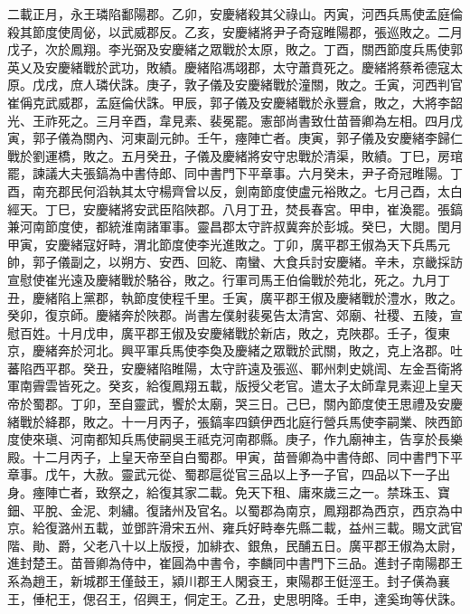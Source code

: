 \begin{pinyinscope}
 二載正月，永王璘陷鄱陽郡。乙卯，安慶緒殺其父祿山。丙寅，河西兵馬使孟庭倫殺其節度使周佖，以武威郡反。乙亥，安慶緒將尹子奇寇睢陽郡，張巡敗之。二月戊子，次於鳳翔。李光弼及安慶緒之眾戰於太原，敗之。丁酉，關西節度兵馬使郭英乂及安慶緒戰於武功，敗績。慶緒陷馮翊郡，太守蕭賁死之。慶緒將蔡希德寇太原。戊戌，庶人璘伏誅。庚子，敦子儀及安慶緒戰於潼關，敗之。壬寅，河西判官崔偁克武威郡，孟庭倫伏誅。甲辰，郭子儀及安慶緒戰於永豐倉，敗之，大將李韶光、王祚死之。三月辛酉，韋見素、裴冕罷。憲部尚書致仕苗晉卿為左相。四月戊寅，郭子儀為關內、河東副元帥。壬午，瘞陣亡者。庚寅，郭子儀及安慶緒李歸仁戰於劉運橋，敗之。五月癸丑，子儀及慶緒將安守忠戰於清渠，敗績。丁巳，房琯罷，諫議大夫張鎬為中書侍郎、同中書門下平章事。六月癸未，尹子奇冠睢陽。丁酉，南充郡民何滔執其太守楊齊曾以反，劍南節度使盧元裕敗之。七月己酉，太白經天。丁巳，安慶緒將安武臣陷陜郡。八月丁丑，焚長春宮。甲申，崔渙罷。張鎬兼河南節度使，都統淮南諸軍事。靈昌郡太守許叔冀奔於彭城。癸巳，大閱。閏月甲寅，安慶緒寇好畤，渭北節度使李光進敗之。丁卯，廣平郡王俶為天下兵馬元帥，郭子儀副之，以朔方、安西、回紇、南蠻、大食兵討安慶緒。辛未，京畿採訪宣慰使崔光遠及慶緒戰於駱谷，敗之。行軍司馬王伯倫戰於苑北，死之。九月丁丑，慶緒陷上黨郡，執節度使程千里。壬寅，廣平郡王俶及慶緒戰於澧水，敗之。癸卯，復京師。慶緒奔於陜郡。尚書左僕射裴冕告太清宮、郊廟、社稷、五陵，宣慰百姓。十月戊申，廣平郡王俶及安慶緒戰於新店，敗之，克陜郡。壬子，復東京，慶緒奔於河北。興平軍兵馬使李奐及慶緒之眾戰於武關，敗之，克上洛郡。吐蕃陷西平郡。癸丑，安慶緒陷睢陽，太守許遠及張巡、鄆州刺史姚訚、左金吾衛將軍南霽雲皆死之。癸亥，給復鳳翔五載，版授父老官。遣太子太師韋見素迎上皇天帝於蜀郡。丁卯，至自靈武，饗於太廟，哭三日。己巳，關內節度使王思禮及安慶緒戰於絳郡，敗之。十一月丙子，張鎬率四鎮伊西北庭行營兵馬使李嗣業、陜西節度使來瑱、河南都知兵馬使嗣吳王祗克河南郡縣。庚子，作九廟神主，告享於長樂殿。十二月丙子，上皇天帝至自白蜀郡。甲寅，苗晉卿為中書侍郎、同中書門下平章事。戊午，大赦。靈武元從、蜀郡扈從官三品以上予一子官，四品以下一子出身。瘞陣亡者，致祭之，給復其家二載。免天下租、庸來歲三之一。禁珠玉、寶鈿、平脫、金泥、刺繡。復諸州及官名。以蜀郡為南京，鳳翔郡為西京，西京為中京。給復潞州五載，並鄧許滑宋五州、雍兵好畤奉先縣二載，益州三載。賜文武官階、勛、爵，父老八十以上版授，加緋衣、銀魚，民酺五日。廣平郡王俶為太尉，進封楚王。苗晉卿為侍中，崔圓為中書令，李麟同中書門下三品。進封子南陽郡王系為趙王，新城郡王僅鼓王，潁川郡王人閑袞王，東陽郡王侹涇王。封子僙為襄王，倕杞王，偲召王，佋興王，侗定王。乙丑，史思明降。壬申，達奚珣等伏誅。




\end{pinyinscope}
